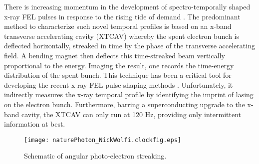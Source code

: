 







There is increasing momentum in the development of spectro-temporally shaped x-ray FEL pulses \cite{eehg2009,Lutman13_twocolor,Marinelli13_twocolor,Allaria2014,Marinelli2015,Hemsing2016,Prince2016,Lutman2016,LutmanFreshSlice2016,Marinelli2016} in response to the rising tide of demand \cite{Cederbaum2008,Mukamel2007,Biggs2012,Mukamel2013,4WaveMixing,TIGER2015,ArtemFOA}.
The predominant method to characterize such novel temporal profiles is based on an x-band transverse accelerating cavity (XTCAV) \cite{xtcav2014} whereby the spent electron bunch is deflected horizontally, streaked in time by the phase of the transverse accelerating field.
A bending magnet then deflects this time-streaked beam vertically proportional to the energy.
Imaging the result, one records the time-energy distribution of the spent bunch.
This technique has been a critical tool for developing the recent x-ray FEL pulse shaping methods \cite{Marinelli2015,Marinelli2016,LutmanFreshSlice2016,Lutman2016}.
Unfortunately, it indirectly measures the x-ray temporal profile by identifying the imprint of lasing on the electron bunch.
Furthermore, barring a superconducting upgrade to the x-band cavity, the XTCAV can only run at 120 Hz, providing only intermittent information at best.

\begin{wrapfigure}[10]{r}{.5\linewidth}
\vspace{-\baselineskip}
\centerline{
	\texttt{[image: naturePhoton\_NickWolfi.clockfig.eps]}
}
\vspace{-\baselineskip}
\caption{
	\label{streakingschematic} 
	Schematic of angular photo-electron streaking. \cite{Nick2018}
}
\end{wrapfigure}

